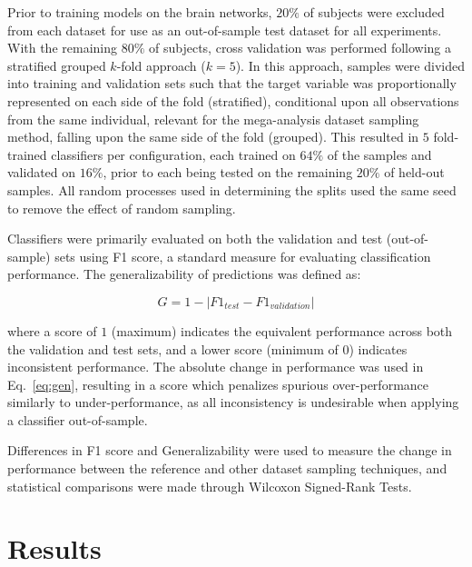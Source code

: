 \documentclass[10pt]{SelfArx} %
\begin{document}
Prior to training models on the brain networks, $20\%$ of subjects were excluded from each dataset for use as an
out-of-sample test dataset for all experiments. With the remaining $80\%$ of subjects, cross validation was performed
following a stratified grouped $k$-fold approach ($k=5$). In this approach, samples were divided into training and
validation sets such that the target variable was proportionally represented on each side of the fold (stratified),
conditional upon all observations from the same individual, relevant for the mega-analysis dataset sampling method,
falling upon the same side of the fold (grouped). This resulted in $5$ fold-trained classifiers per configuration, each
trained on $64\%$ of the samples and validated on $16\%$, prior to each being tested on the remaining $20\%$ of
held-out samples. All random processes used in determining the splits used the same seed to remove the effect of random
sampling.

Classifiers were primarily evaluated on both the validation and test (out-of-sample) sets using F1 score, a standard
measure for evaluating classification performance. The generalizability of predictions was defined as:

\begin{equation}
G = 1 - \lvert F1_{test} - F1_{validation} \rvert
\label{eq:gen}
\end{equation}

where a score of $1$ (maximum) indicates the equivalent performance across both the validation and test sets, and a
lower score (minimum of $0$) indicates inconsistent performance. The absolute change in performance was used in
Eq.~\ref{eq:gen}, resulting in a score which penalizes spurious over-performance similarly to under-performance, as all
inconsistency is undesirable when applying a classifier out-of-sample.

Differences in F1 score and Generalizability were used to measure the change in performance between the reference and
other dataset sampling techniques, and statistical comparisons were made through Wilcoxon Signed-Rank Tests.


\section*{Results}
\end{document}
